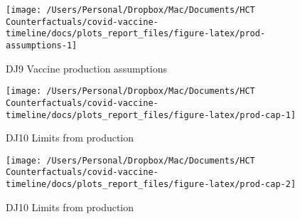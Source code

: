 \documentclass[
]{article}
\begin{document}
\begin{figure}

{\centering \texttt{[image: /Users/Personal/Dropbox/Mac/Documents/HCT Counterfactuals/covid-vaccine-timeline/docs/plots\_report\_files/figure-latex/prod-assumptions-1]} 

}

\caption{DJ9 Vaccine production assumptions}\label{fig:prod-assumptions}
\end{figure}

\begin{figure}

{\centering \texttt{[image: /Users/Personal/Dropbox/Mac/Documents/HCT Counterfactuals/covid-vaccine-timeline/docs/plots\_report\_files/figure-latex/prod-cap-1]} 

}

\caption{DJ10 Limits from production}\label{fig:prod-cap-1}
\end{figure}
\begin{figure}

{\centering \texttt{[image: /Users/Personal/Dropbox/Mac/Documents/HCT Counterfactuals/covid-vaccine-timeline/docs/plots\_report\_files/figure-latex/prod-cap-2]} 

}

\caption{DJ10 Limits from production}\label{fig:prod-cap-2}
\end{figure}
\end{document}
